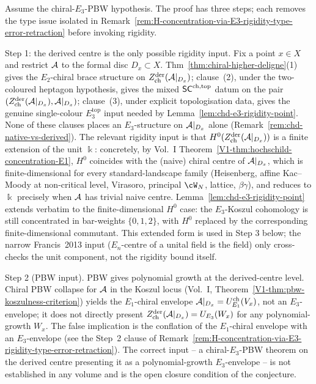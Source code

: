 \begin{remark}%
\label{rem:H-concentration-via-E3-rigidity-proof-route}%
%
Assume the chiral-$E_3$-PBW hypothesis. The proof has three steps; each
removes the type issue isolated in
Remark~\ref{rem:H-concentration-via-E3-rigidity-type-error-retraction}
before invoking rigidity.

Step 1: the derived centre is the only possible rigidity input. Fix a
point $x \in X$ and restrict $\mathcal{A}$ to the formal disc
$D_x \subset X$. Thm~\ref{thm:chiral-higher-deligne}(1) gives the
$E_2$-chiral brace structure on
$Z^{\mathrm{der}}_{\mathrm{ch}}(\mathcal{A}|_{D_x})$; clause~(2), under the
two-coloured heptagon hypothesis, gives the mixed $\mathsf{SC}^{\mathrm{ch},\mathrm{top}}$ datum on
the pair
$(Z^{\mathrm{der}}_{\mathrm{ch}}(\mathcal{A}|_{D_x}),\mathcal{A}|_{D_x})$; clause~(3),
under explicit topologisation data, gives the genuine single-colour
$E_3^{\mathrm{top}}$ input needed by
Lemma~\ref{lem:chd-e3-rigidity-point}. None of these clauses places
an $E_3$-structure on $\mathcal{A}|_{D_x}$ alone
(Remark~\ref{rem:chd-native-vs-derived}). The relevant rigidity input is
that $H^0(Z^{\mathrm{der}}_{\mathrm{ch}}(\mathcal{A}|_{D_x}))$ is a finite
extension of the unit $\Bbbk$: concretely, by Vol.~I
Theorem~\ref*{V1-thm:hochschild-concentration-E1}, $H^0$ coincides with
the (naive) chiral centre of $\mathcal{A}|_{D_x}$, which is finite-dimensional
for every standard-landscape family (Heisenberg, affine Kac--Moody at
non-critical level, Virasoro, principal $\cW_N$, lattice, $\beta\gamma$),
and reduces to $\Bbbk$ precisely when $\mathcal{A}$ has trivial naive centre.
Lemma~\ref{lem:chd-e3-rigidity-point} extends verbatim to the
finite-dimensional $H^0$ case: the $E_3$-Koszul cohomology is
still concentrated in bar-weights $\{0,1,2\}$, with $H^0$ replaced
by the corresponding finite-dimensional commutant. This extended
form is used in Step 3 below; the narrow Francis~2013 input
($E_n$-centre of a unital field is the field) only cross-checks
the unit component, not the rigidity bound itself.

Step 2 (PBW input). PBW gives
polynomial growth at the derived-centre level. Chiral PBW collapse
for $\mathcal{A}$ in the Koszul locus (Vol.~I,
Theorem~\ref*{V1-thm:pbw-koszulness-criterion}) yields the $E_1$-chiral
envelope $\mathcal{A}|_{D_x} = U_{E_1}^{\mathrm{ch}}(V_x)$, not an
$E_3$-envelope; it does not directly present
$Z^{\mathrm{der}}_{\mathrm{ch}}(\mathcal{A}|_{D_x}) = U_{E_3}(W_x)$ for any
polynomial-growth $W_x$. The false implication is the conflation of
the $E_1$-chiral envelope with an $E_3$-envelope (see the Step~2
clause of
Remark~\ref{rem:H-concentration-via-E3-rigidity-type-error-retraction}).
The correct input -- a chiral-$E_3$-PBW theorem on the derived centre
presenting it as a polynomial-growth $E_3$-envelope -- is not
established in any volume and is the open closure condition of the
conjecture.


\end{remark}
